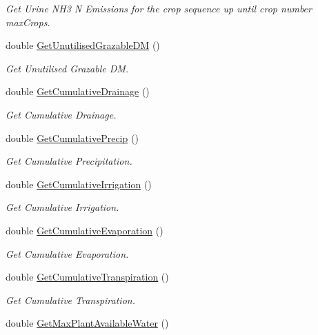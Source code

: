 \begin{DoxyCompactItemize}
\begin{DoxyCompactList}\small\item\em Get Urine N\+H3 N Emissions for the crop sequence up until crop number max\+Crops. \end{DoxyCompactList}\item 
double \mbox{\hyperlink{class_crop_sequence_class_a5a8f90566c9a156ed63c8288b5680456}{Get\+Unutilised\+Grazable\+DM}} ()
\begin{DoxyCompactList}\small\item\em Get Unutilised Grazable DM. \end{DoxyCompactList}\item 
double \mbox{\hyperlink{class_crop_sequence_class_ad116e8e609a06cfe2786fc329ac904a7}{Get\+Cumulative\+Drainage}} ()
\begin{DoxyCompactList}\small\item\em Get Cumulative Drainage. \end{DoxyCompactList}\item 
double \mbox{\hyperlink{class_crop_sequence_class_ace737f0ef9c1015f13b5337a85a4b9f6}{Get\+Cumulative\+Precip}} ()
\begin{DoxyCompactList}\small\item\em Get Cumulative Precipitation. \end{DoxyCompactList}\item 
double \mbox{\hyperlink{class_crop_sequence_class_aabf83d4192b4052fa22545979aad733f}{Get\+Cumulative\+Irrigation}} ()
\begin{DoxyCompactList}\small\item\em Get Cumulative Irrigation. \end{DoxyCompactList}\item 
double \mbox{\hyperlink{class_crop_sequence_class_a81d03c6e8e88caa6bc03c8829eafa16b}{Get\+Cumulative\+Evaporation}} ()
\begin{DoxyCompactList}\small\item\em Get Cumulative Evaporation. \end{DoxyCompactList}\item 
double \mbox{\hyperlink{class_crop_sequence_class_a98b391f28522243c1274cf1c4f5a5f53}{Get\+Cumulative\+Transpiration}} ()
\begin{DoxyCompactList}\small\item\em Get Cumulative Transpiration. \end{DoxyCompactList}\item 
double \mbox{\hyperlink{class_crop_sequence_class_ae4d5d6dc25fed5326716a2ce9f9ee1cd}{Get\+Max\+Plant\+Available\+Water}} ()

\end{DoxyCompactItemize}
